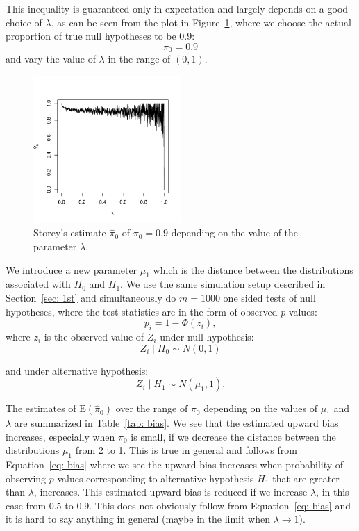 \documentclass[10pt]{article}
\begin{document}
This inequality is guaranteed only in expectation and largely depends on a good choice of $\lambda$, as can be seen from the plot in Figure~\ref{fig: pi0_of_lambda}, where we choose the actual proportion of true null hypotheses to be 0.9: 
\begin{equation}
\pi_{0} = 0.9
\end{equation}
and vary the value of $\lambda$ in the range of $(0, 1)$. 

\begin{figure}[H]
	\centering
	\includegraphics[width=0.5\textwidth]{../data/pi0_of_lambda.pdf}
	\caption{Storey's estimate $\widehat{\pi}_{0}$ of $\pi_{0} = 0.9$ depending on the value of the parameter $\lambda$.}
	\label{fig: pi0_of_lambda}	
\end{figure}

We introduce a new parameter $\mu_{1}$ which is the distance between the distributions associated with $H_{0}$ and $H_{1}$. We use the same simulation setup described in Section~\ref{sec: 1st} and simultaneously do $m = 1000$ one sided tests of null hypotheses, where the test statistics are in the form of observed $p$-values:
\begin{equation}
p_{i} = 1 - \Phi(z_{i}), %
\end{equation}
where $z_{i}$ is the observed value of $Z_{i}$ under null hypothesis:
\begin{equation}
	Z_{i} \mid H_{0} \sim N(0, 1)
\end{equation} 

and under alternative hypothesis: 
\begin{equation}
	Z_{i} \mid H_{1} \sim N(\mu_{1}, 1).
\end{equation}

The estimates of $\text{E}(\widehat{\pi}_{0})$ over the range of $\pi_{0}$ depending on the values of $\mu_{1}$ and $\lambda$ are summarized in Table~\ref{tab: bias}. We see that the estimated upward bias increases, especially when $\pi_{0}$ is small, if we decrease the distance between the distributions $\mu_{1}$ from 2 to 1. This is true in general and follows from Equation~\ref{eq: bias} where we see the upward bias increases when probability of observing $p$-values corresponding to alternative hypothesis $H_{1}$ that are greater than $\lambda$, increases. This estimated upward bias is reduced if we increase $\lambda$, in this case from $0.5$ to $0.9$. This does not obviously follow from Equation~\ref{eq: bias} and it is hard to say anything in general (maybe in the limit when $\lambda \rightarrow 1$).
\end{document}
